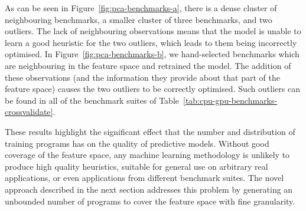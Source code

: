 As can be seen in Figure~\ref{fig:pca-benchmarks-a}, there is a dense cluster of neighbouring benchmarks, a smaller cluster of three benchmarks, and two outliers. The lack of neighbouring observations means that the model is unable to learn a good heuristic for the two outliers, which leads to them being incorrectly optimised. In Figure~\ref{fig:pca-benchmarks-b}, we hand-selected benchmarks which are neighbouring in the feature space and retrained the model. The addition of these observations (and the information they provide about that part of the feature space) causes the two outliers to be correctly optimised. Such outliers can be found in all of the benchmark suites of Table~\ref{tab:cpu-gpu-benchmarks-crossvalidate}.

These results highlight the significant effect that the number and distribution of training programs has on the quality of predictive models. Without good coverage of the feature space, any machine learning methodology is unlikely to produce high quality heuristics, suitable for general use on arbitrary real applications, or even applications from different benchmark suites. The novel approach described in the next section addresses this problem by generating an unbounded number of programs to cover the feature space with fine granularity.
